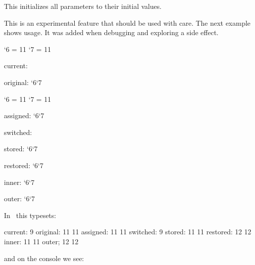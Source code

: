 This initializes all parameters to their initial values.

\stopnewprimitive

\startnewprimitive[title={\prm {restorecatcodetable}}]

This is an experimental feature that should be used with care. The next example
shows usage. It was added when debugging and exploring a side effect.

\starttyping
{}

\bgroup

    \catcode`6 = 11 \catcode`7 = 11

    \bgroup


    current: \the\catcodetable

    original: \the\catcode`6\quad \the\catcode`7

    \catcode`6 = 11 \catcode`7 = 11

    \showcodestack\catcode

    assigned: \the\catcode`6\quad \the\catcode`7

    \showcodestack\catcode

    \catcodetable\ctxcatcodes switched: \the\catcodetable

    stored: \the\catcode`6\quad \the\catcode`7

    \showcodestack\catcode

    \restorecatcodetable\ctxcatcodes

    \showcodestack\catcode

    restored: \the\catcode`6\quad \the\catcode`7

    \showcodestack\catcode

    \egroup

    \catcodetable\ctxcatcodes

    inner: \the\catcode`6\quad\the\catcode`7

\egroup

outer: \the\catcode`6\quad\the\catcode`7
\stoptyping

In \CONTEXT\ this typesets:

\starttyping
current: 9
original: 11 11
assigned: 11 11
switched: 9
stored: 11 11
restored: 12 12
inner: 11 11
outer; 12 12
\stoptyping

and on the console we see:

